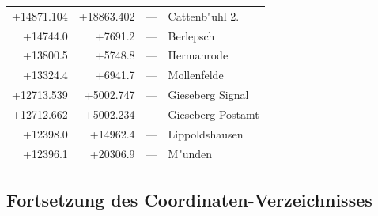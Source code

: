 \documentclass[12pt,a4paper]{article}
\begin{document}
\begin{longtable}{r r l p{6cm}}
+14871.104 & +18863.402 & --- & Cattenb{"u}hl 2. \\
+14744.0 & +7691.2 & --- & Berlepsch \\
+13800.5 & +5748.8 & --- & Hermanrode \\
+13324.4 & +6941.7 & --- & Mollenfelde \\
+12713.539 & +5002.747 & --- & Gieseberg Signal \\
+12712.662 & +5002.234 & --- & Gieseberg Postamt \\
+12398.0 & +14962.4 & --- & Lippoldshausen \\
+12396.1 & +20306.9 & --- & M{"u}nden \\
\end{longtable}

\normalsize

\newpage
\subsection*{Fortsetzung des Coordinaten-Verzeichnisses}

\small
\end{document}
